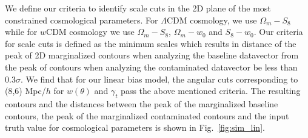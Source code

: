 \documentclass[fleqn,usenatbib]{mnras}
\begin{document}
We define our criteria to identify  scale cuts in the 2D plane of the most constrained cosmological parameters. For $\Lambda$CDM cosmology, we use $\Omega_m - S_8$ while for $w$CDM cosmology we use $\Omega_m-S_8$, $\Omega_m-w_0$ and $S_8-w_0$. Our criteria for scale cuts is defined as the minimum scales which results in distance of the peak of 2D marginalized contours when analyzing the baseline datavector from the peak of contours when analyzing the contaminated datavector be less than 0.3$\sigma$. We find that for our linear bias model, the angular cuts corresponding to (8,6) Mpc/$h$ for $w(\theta)$ and $\gamma_t$ pass the above mentioned criteria. The resulting contours and the distances between the peak of the marginalized baseline contours, the peak of the marginalized contaminated contours and the input truth value for cosmological parameters is shown in Fig.~\ref{fig:sim_lin}. 
\end{document}
